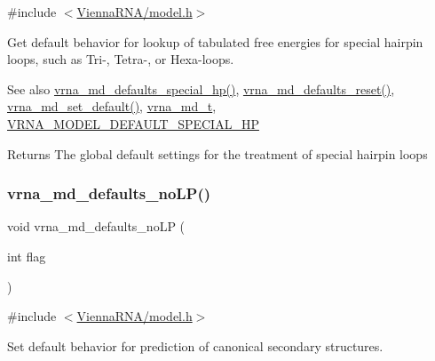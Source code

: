 {\ttfamily \#include $<$\hyperlink{model_8h}{Vienna\+R\+N\+A/model.\+h}$>$}



Get default behavior for lookup of tabulated free energies for special hairpin loops, such as Tri-\/, Tetra-\/, or Hexa-\/loops. 

\begin{DoxySeeAlso}{See also}
\hyperlink{group__model__details_gafff6449a02744add0308e653230c15fc}{vrna\+\_\+md\+\_\+defaults\+\_\+special\+\_\+hp()}, \hyperlink{group__model__details_ga70834424cf804d149937de89f80ceb45}{vrna\+\_\+md\+\_\+defaults\+\_\+reset()}, \hyperlink{group__model__details_ga8ac6ff84936282436f822644bf841f66}{vrna\+\_\+md\+\_\+set\+\_\+default()}, \hyperlink{group__model__details_ga1f8a10e12a0a1915f2a4eff0b28ea17c}{vrna\+\_\+md\+\_\+t}, \hyperlink{group__model__details_gabd1ab224e1048defd45c165ed7d1c108}{V\+R\+N\+A\+\_\+\+M\+O\+D\+E\+L\+\_\+\+D\+E\+F\+A\+U\+L\+T\+\_\+\+S\+P\+E\+C\+I\+A\+L\+\_\+\+HP} 
\end{DoxySeeAlso}
\begin{DoxyReturn}{Returns}
The global default settings for the treatment of special hairpin loops 
\end{DoxyReturn}
\mbox{\label{group__model__details_ga2f88ffc393ac9d7987849c965fd29ea8}} 
\subsubsection{\texorpdfstring{vrna\+\_\+md\+\_\+defaults\+\_\+no\+L\+P()}{vrna\_md\_defaults\_noLP()}}
{\footnotesize\ttfamily void vrna\+\_\+md\+\_\+defaults\+\_\+no\+LP (\begin{DoxyParamCaption}\item[{int}]{flag }\end{DoxyParamCaption})}



{\ttfamily \#include $<$\hyperlink{model_8h}{Vienna\+R\+N\+A/model.\+h}$>$}



Set default behavior for prediction of canonical secondary structures. 

